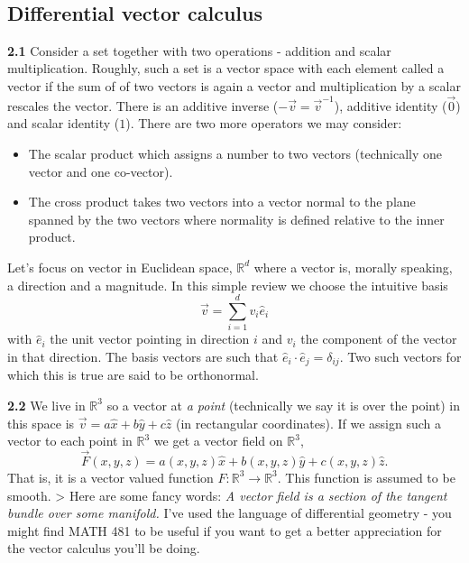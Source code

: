 \documentclass[11pt]{article}
\providecommand{\tightlist}{%
      \setlength{\itemsep}{0pt}\setlength{\parskip}{0pt}}
\begin{document}
    \begin{center}
    \end{center}
    { \hspace*{\fill} \\}
    
    \hypertarget{differential-vector-calculus}{%
\subsection{Differential vector
calculus}\label{differential-vector-calculus}}

\textbf{2.1} Consider a set together with two operations - addition and
scalar multiplication. Roughly, such a set is a vector space with each
element called a vector if the sum of of two vectors is again a vector
and multiplication by a scalar rescales the vector. There is an additive
inverse (\(-\vec v=\vec v^{-1}\)), additive identity (\(\vec 0\)) and
scalar identity (\(1\)). There are two more operators we may consider:

\begin{itemize}
\tightlist
\item
  The scalar product which assigns a number to two vectors (technically
  one vector and one co-vector).
\item
  The cross product takes two vectors into a vector normal to the plane
  spanned by the two vectors where normality is defined relative to the
  inner product.
\end{itemize}

Let's focus on vector in Euclidean space, \(\mathbb{R}^d\) where a
vector is, morally speaking, a direction and a magnitude. In this simple
review we choose the intuitive basis \[
\vec v =\sum_{i=1}^dv_i\hat e_i
\] with \(\hat e_i\) the unit vector pointing in direction \(i\) and
\(v_i\) the component of the vector in that direction. The basis vectors
are such that \(\hat e_i\cdot \hat e_j = \delta_{ij}\). Two such vectors
for which this is true are said to be orthonormal.

\textbf{2.2} We live in \(\mathbb R^3\) so a vector at \emph{a point}
(technically we say it is over the point) in this space is
\(\vec v = a \hat x+ b\hat y+c \hat z\) (in rectangular coordinates). If
we assign such a vector to each point in \(\mathbb R^3\) we get a vector
field on \(\mathbb R^3\), \[
\vec F(x,y,z) = a(x,y,z)\hat x+b(x,y,z)\hat y+c(x,y,z)\hat z.
\] That is, it is a vector valued function
\(F:\mathbb R^3\to \mathbb R^3\). This function is assumed to be smooth.
\textgreater{} Here are some fancy words: \emph{A vector field is a
section of the tangent bundle over some manifold.} I've used the
language of differential geometry - you might find MATH 481 to be useful
if you want to get a better appreciation for the vector calculus you'll
be doing.
\end{document}
